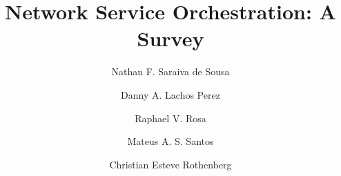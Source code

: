 \documentclass[preprint,10pt,number,5p,twocolumn]{elsarticle}
\begin{document}
\begin{frontmatter}



\title{Network Service Orchestration: A Survey}


\author[First]{Nathan F. Saraiva de Sousa}
\author[First]{Danny A. Lachos Perez}
\author[First]{Raphael V. Rosa}
\author[Second]{Mateus A. S. Santos}
\author[First]{Christian Esteve Rothenberg}

\address[First]{Department of Computer Engineering and Industrial Automation, School of Electrical and Computer Engineering, University of Campinas --- UNICAMP, Campinas, SP, Brazil}
\address[Second]{Ericsson Research, Indaiatuba, SP, Brazil}



\end{frontmatter}
\end{document}
